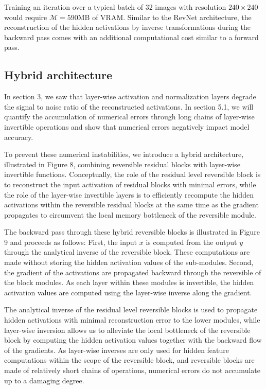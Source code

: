 \documentclass[twocolumn]{bmcart}
\begin{document}
Training an iteration over a typical batch of 32 images with resolution $240 \times 240$ would require $\mathcal{M}=590$MB of VRAM. 
Similar to the RevNet architecture, the reconstruction of the hidden activations by inverse transformations during the backward pass comes with an additional computational cost similar to a forward pass.

\subsection{Hybrid architecture}

In section 3, we saw that layer-wise activation and normalization layers degrade the signal to noise ratio of the reconstructed activations.
In section 5.1, we will quantify the accumulation of numerical errors through long chains of layer-wise invertible operations and show that numerical errors negatively impact model accuracy.

To prevent these numerical instabilities, we introduce a hybrid architecture, illustrated in Figure 8, combining reversible residual blocks with layer-wise invertible functions.
Conceptually, the role of the residual level reversible block is to reconstruct the input activation of residual blocks with minimal errors, 
while the role of the layer-wise invertible layers is to efficiently recompute the hidden activations within the reversible residual 
blocks at the same time as the gradient propagates to circumvent the local memory bottleneck of the reversible module.

The backward pass through these hybrid reversible blocks is illustrated in Figure 9 and proceeds as follows: 
First, the input $x$ is computed from the output $y$ through the analytical inverse of the reversible block.
These computations are made without storing the hidden activation values of the sub-modules.
Second, the gradient of the activations are propagated backward through the reversible of the block modules.
As each layer within these modules is invertible, the hidden activation values
are computed using the layer-wise inverse along the gradient.

The analytical inverse of the residual level reversible blocks is used to propagate hidden activations with minimal reconstruction error to the lower modules,
while layer-wise inversion allows us to alleviate the local bottleneck of the reversible block by computing the hidden activation values together with the backward flow of the gradients. 
As layer-wise inverses are only used for hidden feature computations within the scope of the reversible block,
and reversible blocks are made of relatively short chains of operations,
numerical errors do not accumulate up to a damaging degree.
\end{document}
